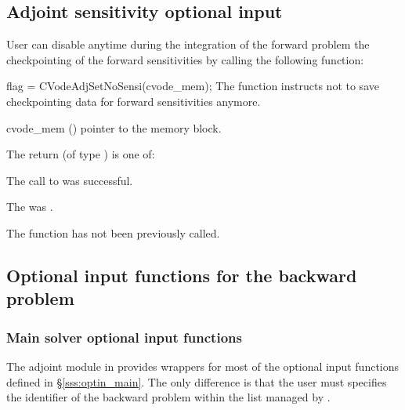 \subsection{Adjoint sensitivity optional input}

User can disable anytime during the integration of the forward problem the 
checkpointing of the forward sensitivities by calling the following function:

{
  flag = CVodeAdjSetNoSensi(cvode\_mem);
}
{
  The function  instructs  not
  to save checkpointing data for forward sensitivities anymore.
}
{
  \begin{args}
  \item[cvode\_mem] ()
    pointer to the {\cvodes}  memory block.
  \end{args}
}
{
  The return  (of type ) is one of:
  \begin{args}
  \item[\Id{CV\_SUCCESS}]
    The call to  was successful.
  \item[\Id{CV\_MEM\_NULL}]
    The  was .
  \item[\Id{CV\_NO\_ADJ}]
    The function  has not been previously called.
  \end{args}
}
{}


\subsection{Optional input functions for the backward problem}
\label{ss:optional_input_b}
\subsubsection{Main solver optional input functions}

The adjoint module in {\cvodes} provides wrappers for most of the optional 
input functions defined in \S\ref{sss:optin_main}. The only difference is 
that the user must specifies the identifier  of the backward problem 
within the list managed by {\cvodes}. 

